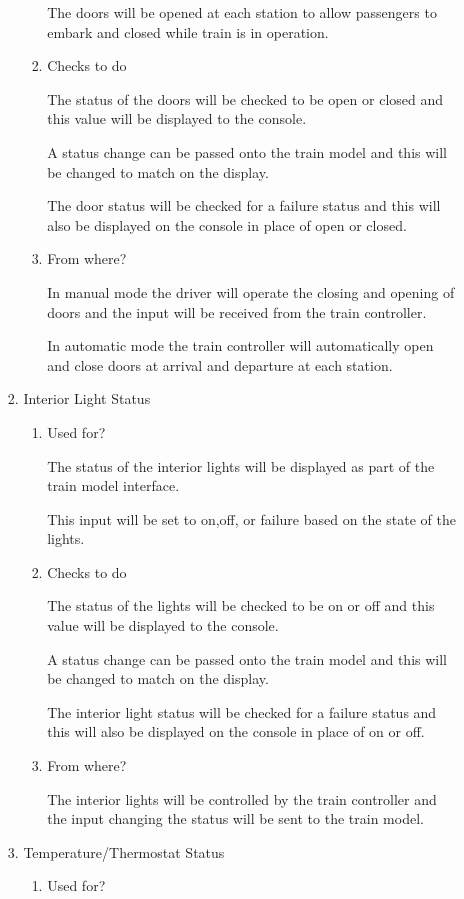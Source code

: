 \documentclass[11pt]{article}
\begin{document}
\begin{enumerate}
\begin{enumerate}
\begin{enumerate}
\begin{enumerate}
The doors will be opened at each station to allow passengers to embark and closed while train is in operation.
\item Checks to do
\label{sec-3-1-4-2-1-3-2}

The status of the doors will be checked to be open or closed and this value will be displayed to the console. 

A status change can be passed onto the train model and this will be changed to match on the display.

The door status will be checked for a failure status and this will also be displayed on the console in place of open or closed.
\item From where?
\label{sec-3-1-4-2-1-3-3}

In manual mode the driver will operate the closing and opening of doors and the input will be received from the train controller.

In automatic mode the train controller will automatically open and close doors at arrival and departure at each station.
\end{enumerate}
\item Interior Light Status
\label{sec-3-1-4-2-1-4}
\begin{enumerate}
\item Used for?
\label{sec-3-1-4-2-1-4-1}

The status of the interior lights will be displayed as part of the train model interface. 

This input will be set to on,off, or failure based on the state of the lights. 
\item Checks to do
\label{sec-3-1-4-2-1-4-2}

The status of the lights will be checked to be on or off and this value will be displayed to the console. 

A status change can be passed onto the train model and this will be changed to match on the display.

The interior light status will be checked for a failure status and this will also be displayed on the console in place of on or off.
\item From where?
\label{sec-3-1-4-2-1-4-3}

The interior lights will be controlled by the train controller and the input changing the status will be sent to the train model.
\end{enumerate}
\item Temperature/Thermostat Status
\label{sec-3-1-4-2-1-5}
\begin{enumerate}
\item Used for?
\label{sec-3-1-4-2-1-5-1}


\end{enumerate}
\end{enumerate}
\end{enumerate}
\end{enumerate}
\end{document}
